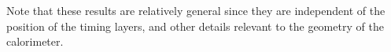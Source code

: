 Note that these results are relatively general since they are 
independent of the position of the timing layers, and other details relevant to 
the geometry of the calorimeter.  

\begin{figure}
\begin{center}



\end{center}
\end{figure}
